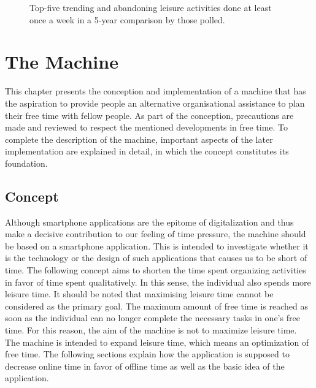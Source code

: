 \documentclass[12pt,numbers=noenddot,parskip,bibliography=totocnumbered,listof=totocnumbered]{scrreprt}
\begin{document}
\begin{figure}
\caption{Top-five trending and abandoning leisure activities done at least once a week in a 5-year comparison by those polled. \citep{freizeitmonitor2016}}
\label{topfivechangingleisureactivities}
\end{figure}

\chapter{The Machine}
This chapter presents the conception and implementation of a machine that has the aspiration to provide people an alternative organisational assistance to plan their free time with fellow people. As part of the conception, precautions are made and reviewed to respect the mentioned developments in free time. To complete the description of the machine, important aspects of the later implementation are explained in detail, in which the concept constitutes its foundation.%

\section{Concept}
Although smartphone applications are the epitome of digitalization and thus make a decisive contribution to our feeling of time pressure, the machine should be based on a smartphone application. This is intended to investigate whether it is the technology or the design of such applications that causes us to be short of time. The following concept aims to shorten the time spent organizing activities in favor of time spent qualitatively. In this sense, the individual also spends more leisure time. It should be noted that maximising leisure time cannot be considered as the primary goal. The maximum amount of free time is reached as soon as the individual can no longer complete the necessary tasks in one's free time. For this reason, the aim of the machine is not to maximize leisure time. The machine is intended to expand leisure time, which means an optimization of free time. The following sections explain how the application is supposed to decrease online time in favor of offline time as well as the basic idea of the application.
\end{document}
